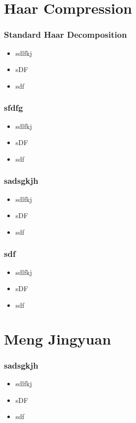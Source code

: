 \documentclass{beamer}
\begin{document}
\section{Haar Compression}
\begin{frame}
    \frametitle{Standard Haar Decomposition}
    \begin{itemize}
        \item sdlfkj
        \item sDF
        \item sdf
    \end{itemize}
\end{frame}
\begin{frame}
    \frametitle{sfdfg}
    \begin{itemize}
        \item sdlfkj
        \item sDF
        \item sdf
    \end{itemize}
\end{frame}
\begin{frame}
    \frametitle{sadsgkjh}
    \begin{itemize}
        \item sdlfkj
        \item sDF
        \item sdf
    \end{itemize}
\end{frame}
\begin{frame}
    \frametitle{sdf}
    \begin{itemize}
        \item sdlfkj
        \item sDF
        \item sdf
    \end{itemize}
\end{frame}

\section{Meng Jingyuan}
\begin{frame}
    \frametitle{sadsgkjh}
    \begin{itemize}
        \item sdlfkj
        \item sDF
        \item sdf
    \end{itemize}
\end{frame}
\end{document}
